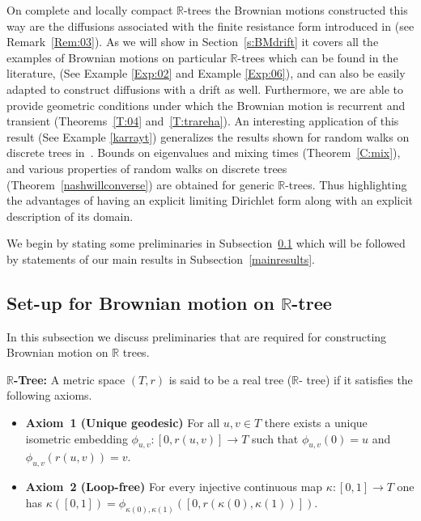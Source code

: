 \documentclass[11pt]{amsart}
\numberwithin{equation}{section}
\begin{document}
On complete and locally compact ${{\mathbb R}}$-trees  the Brownian motions constructed this way  are the diffusions associated with the finite resistance form introduced in \cite{Kigami95} (see Remark~\ref{Rem:03}).  As we will show in Section~\ref{s:BMdrift}  it covers all the examples of Brownian motions on particular ${{\mathbb R}}$-trees which can be found in the literature, (See Example \ref{Exp:02} and Example \ref{Exp:06}), and  can also be easily adapted  to construct diffusions with a drift as well.   Furthermore,  we are able to  provide geometric conditions under which the {Brownian motion} is recurrent and transient (Theorems~\ref{T:04} and~\ref{T:trareha}). An interesting application of this result (See Example \ref{karrayt}) generalizes the results shown for random walks on discrete trees in~\cite{Lyo90}.  Bounds on eigenvalues and mixing times (Theorem~\ref{C:mix}),  and various properties of random walks on discrete trees (Theorem~\ref{nashwillconverse}) are obtained for generic ${{\mathbb R}}$-trees. Thus highlighting the advantages of having an explicit limiting Dirichlet form along with an explicit description of its domain. {\smallskip}

We begin by stating some preliminaries in Subsection~\ref{prelim} which will be followed by statements of our main results in Subsection~\ref{mainresults}.

 \subsection{Set-up for Brownian motion on ${{\mathbb R}}$-tree} \label{prelim}
 In this subsection we discuss preliminaries that are required for constructing Brownian motion on ${{\mathbb R}}$ trees.

 \medskip

 {\bf ${{\mathbb R}}$-Tree:} A metric space $(T,r)$ is said to be a {{\it} real tree }(${{\mathbb R}}$- {{\it} tree}) if it
satisfies the following axioms.

\begin{itemize}
\item[{}]{\bf Axiom~1 (Unique geodesic) } For all ${u},{v}\in T$
there exists a unique isometric embedding
  $\phi_{{u},{v}}:[0,{r}({u},{v})]\to T$ such that $\phi_{{u},{v}}(0)={u}$
and $\phi_{{u},{v}}({r}({u},{v}))={v}$.\vspace{1mm}
\item[{}]{\bf Axiom~2 (Loop-free) } For every injective
continuous map $\kappa:[0,1]\to T$ one has
$\kappa([0,1])=\phi_{\kappa(0),\kappa(1)}([0,r(\kappa(0),\kappa(1))])$.
\end{itemize}{\smallskip}
\end{document}
